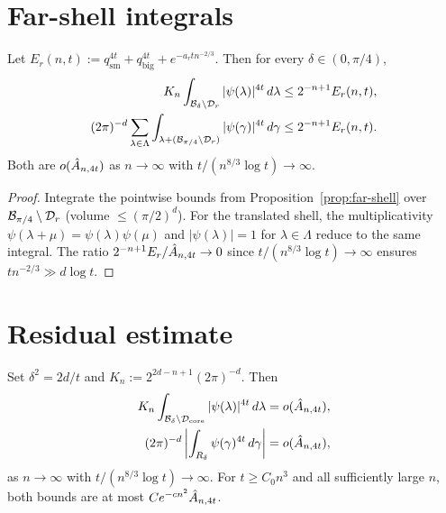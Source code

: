 \section{Far-shell integrals}

\begin{corollary}\label{cor:far-negligible}
\leanok
{}
Let $E_r(n,t):=q_{\mathrm{sm}}^{4t}+q_{\mathrm{big}}^{4t}+e^{-a_r t n^{-2/3}}$.
Then for every $\delta\in(0,\pi/4)$,
\[
  \begin{aligned}
  K_n\int_{\mathcal{B}_\delta\setminus\mathcal{D}_r}|\psi(\lambda)|^{4t}\,d\lambda
    &\le 2^{-n+1}E_r(n,t),\\
  (2\pi)^{-d}\sum_{\lambda\in\Lambda}
    \int_{\lambda+(\mathcal{B}_{\pi/4}\setminus\mathcal{D}_r)}|\psi(\gamma)|^{4t}\,d\gamma
    &\le 2^{-n+1}E_r(n,t).
  \end{aligned}
\]
Both are $o(\hat A_{n,4t})$ as $n\to\infty$ with $t/(n^{8/3}\log t)\to\infty$.
\end{corollary}

\begin{proof}\leanok
{}
Integrate the pointwise bounds from Proposition~\ref{prop:far-shell}
over $\mathcal{B}_{\pi/4}\setminus\mathcal{D}_r$ (volume $\le(\pi/2)^d$).
For the translated shell, the multiplicativity
$\psi(\lambda+\mu)=\psi(\lambda)\psi(\mu)$ and $|\psi(\lambda)|=1$ for
$\lambda\in\Lambda$ reduce to the same integral.
The ratio $2^{-n+1}E_r/\hat A_{n,4t}\to 0$ since
$t/(n^{8/3}\log t)\to\infty$ ensures
$tn^{-2/3}\gg d\log t$.
\end{proof}

\section{Residual estimate}

\begin{proposition}\label{prop:residual-estimate}
\leanok
{}
Set $\delta^2=2d/t$ and $K_n:=2^{2d-n+1}(2\pi)^{-d}$. Then
\[
  \begin{aligned}
    K_n\int_{\mathcal{B}_\delta\setminus\mathcal{D}_\mathrm{core}}|\psi(\lambda)|^{4t}\,d\lambda
    &= o(\hat A_{n,4t}),\\
    (2\pi)^{-d}\left|\int_{R_\delta}\psi(\gamma)^{4t}\,d\gamma\right|
    &= o(\hat A_{n,4t}),
  \end{aligned}
\]
as $n\to\infty$ with $t/(n^{8/3}\log t)\to\infty$.
For $t\ge C_0 n^3$ and all sufficiently large $n$, both bounds
are at most $Ce^{-cn^2}\hat A_{n,4t}$.
\end{proposition}

